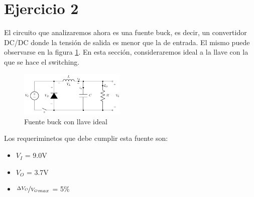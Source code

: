 \documentclass[e4_tp1_main.tex]{subfiles}
\begin{document}
\section{Ejercicio 2}


El circuito que analizaremos ahora es una fuente buck, es decir, un convertidor DC/DC donde la tensi\'on de salida es menor que la de entrada. El mismo puede observarse en la figura \ref{fig:buck-ideal}. En esta secci\'on, consideraremos ideal a la llave con la que se hace el switching.


\begin{figure}
	\centering
	\includegraphics[width=0.45\textwidth]{images/ej2/buck_ideal.pdf}
	\caption{Fuente buck con llave ideal}
	\label{fig:buck-ideal}
\end{figure}

Los requeriminetos que debe cumplir esta fuente son:
\begin{itemize}
	\item $V_I$ = 9.0V
	\item $V_O$ = 3.7V
	\item $\nicefrac{\Delta V_O}{V_O}_{max}$ = 5\%
\end{itemize}

\end{document}
